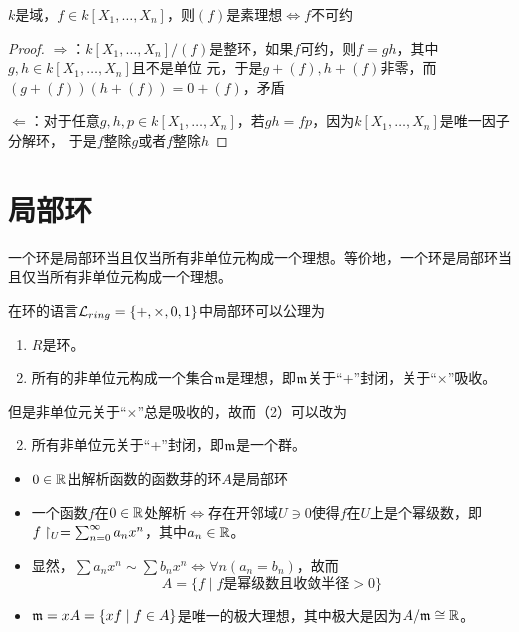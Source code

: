 \documentclass[11pt]{article}
\begin{document}
\begin{corollary}[]
\(k\)是域，\(f\in k[X_1,\dots,X_n]\)，则\((f)\)是素理想\(\Leftrightarrow f\)不可约
\end{corollary}

\begin{proof}
\(\Rightarrow\)：\(k[X_1,\dots,X_n]/(f)\)是整环，如果\(f\)可约，则\(f=gh\)，其中\(g,h\in k[X_1,\dots,X_n]\)且不是单位
元，于是\(g+(f),h+(f)\)非零，而\((g+(f))(h+(f))=0+(f)\)，矛盾

\(\Leftarrow\)：对于任意\(g,h,p\in k[X_1,\dots,X_n]\)，若\(gh=fp\)，因为\(k[X_1,\dots,X_n]\)是唯一因子分解环，
于是\(f\)整除\(g\)或者\(f\)整除\(h\)
\end{proof}
\section{局部环}
\label{sec:org34de702}
一个环是局部环当且仅当所有非单位元构成一个理想。等价地，一个环是局部环当且仅当所有非单位元构成一个理想。

在环的语言\(\mathcal{L}_{ring}=\{+,\times,0,1\}\)中局部环可以公理为
\begin{enumerate}
\item \(R\)是环。
\item 所有的非单位元构成一个集合\(\mathfrak{m}\)是理想，即\(\mathfrak{m}\)关于``+''封闭，关于``\(\times\)''吸收。
\end{enumerate}


但是非单位元关于``\(\times\)''总是吸收的，故而（2）可以改为
\begin{enumerate}
\setcounter{enumi}{1}
\item 所有非单位元关于“+”封闭，即\(\mathfrak{m}\)是一个群。
\end{enumerate}

\begin{remark}
\begin{itemize}
\item \(0\in\mathbb{R}\)出解析函数的函数芽的环\(A\)是局部环
\item 一个函数\(f\)在\(0\in\mathbb{R}\)处解析\(\Leftrightarrow\)存在开邻域\(U\ni 0\)使得\(f\)在\(U\)上是个幂级数，即
\(f\upharpoonright_U=\sum_{n=0}^\infty a_nx^n\)，其中\(a_n\in\mathbb{R}\)。
\item 显然，\(\sum a_nx^n\sim\sum b_nx^n\Leftrightarrow\forall n(a_n=b_n)\)，故而
\begin{equation*}
A=\{f\mid f\text{是幂级数且收敛半径}>0\}
\end{equation*}
\item \(\mathfrak{m}=x A=\{xf\mid f\in A\}\)是唯一的极大理想，其中极大是因为\(A/\mathfrak{m}\cong\mathbb{R}\)。
\end{itemize}
\end{remark}
\end{document}
